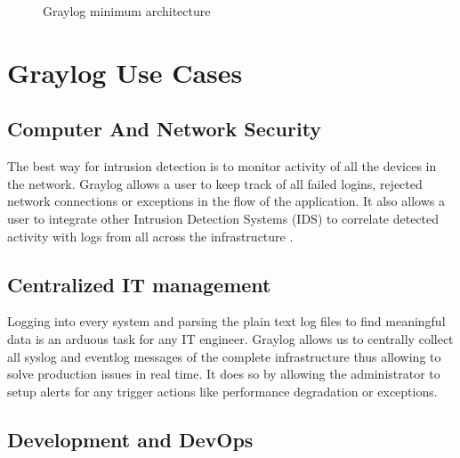 \documentclass[9pt,twocolumn,twoside]{styles/osajnl}
\begin{document}
\begin{figure}[htbp]
\centering
{}
\caption{\cite{www-graylog-docs} Graylog minimum architecture}
\label{fig:Graylog Minimum Architecture}
\end{figure}

\section{Graylog Use Cases}

\subsection{Computer And Network Security}

The best way for intrusion detection is to monitor activity of all the
devices in the network.  Graylog allows a user to keep track of all
failed logins, rejected network connections or exceptions in the flow
of the application. It also allows a user to integrate other Intrusion
Detection Systems (IDS) to correlate detected activity with logs from
all across the infrastructure \cite{www-graylog-org}.

\subsection{Centralized IT management}

Logging into every system and parsing the plain text log files to find
meaningful data is an arduous task for any IT engineer. Graylog allows
us to centrally collect all syslog and eventlog messages of the
complete infrastructure thus allowing to solve production issues in
real time. It does so by allowing the administrator to setup alerts
for any trigger actions like performance degradation or exceptions.

\subsection{Development and DevOps}
\end{document}
